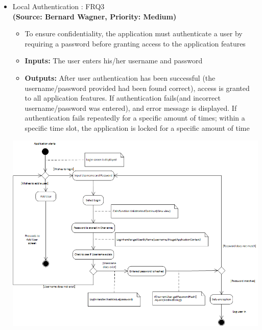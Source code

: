 \begin{itemize}
\newpage
\item{Local Authentication : FRQ3}\\%
\textbf{(Source: Bernard Wagner, Priority: Medium)}
\begin{itemize}
\item To ensure confidentiality, the application must authenticate a user by requiring a password before granting access to the application features
\item \textbf{Inputs:} The user enters his/her username and password
\item \textbf{Outputs:} After user authentication has been successful (the username/password provided had been found correct), access is granted to all application features. If authentication fails(and incorrect username/password was entered), and error message is displayed. If authentication fails repeatedly for a specific amount of times; within a specific time slot, the application is locked for a specific amount of time
\end{itemize}
 \includegraphics[width=13cm]{diagrams/StateDiagrams/LocalAuthenticationStateDiagram.png}
\end{itemize}
\newpage
